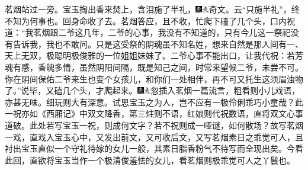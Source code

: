 茗烟站过一旁。宝玉掏出香来焚上，含泪施了半礼，{\includegraphics[width=3mm]{../Images/00004}\includegraphics[width=3mm]{../Images/00012}\footnotesize \kaishu 奇文。云``只施半礼''，终不知为何事也。}回身命收了去。茗烟答应，且不收，忙爬下磕了几个头，口内祝道：``我茗烟跟二爷这几年，二爷的心事，我没有不知道的，只有今儿这一祭祀没有告诉我，我也不敢问。只是这受祭的阴魂虽不知名姓，想来自然是那人间有一、天上无双，极聪明极俊雅的一位姐姐妹妹了。二爷心事不能出口，让我代祝：若芳魂有感，香魄多情，虽然阴阳间隔，既是知己之间，时常来望候二爷，未尝不可。你在阴间保佑二爷来生也变个女孩儿，和你们一处相伴，再不可又托生这须眉浊物了。''说毕，又磕几个头，才爬起来。{\includegraphics[width=3mm]{../Images/00004}\includegraphics[width=3mm]{../Images/00012}\footnotesize \kaishu 忽插入茗烟一篇流言，粗看则小儿戏语，亦甚无味。细玩则大有深意。试思宝玉之为人，岂不应有一极伶俐乖巧小童哉？此一祝亦如《西厢记》中双文降香，第三炷则不语，红娘则代祝数语，直将双文心事道破。此处若写宝玉一祝，则成何文字？若不祝则成一哑谜，如何散场？故写茗烟一戏，直戏入宝玉心中，又发出前文，又可收后文，又写茗烟素日之乖觉可人，且衬出宝玉直似一个守礼待嫁的女儿一般，其素日脂香粉气不待写而全现出矣。今看此回，直欲将宝玉当作一个极清俊羞怯的女儿，看茗烟则极乖觉可人之丫鬟也。}

